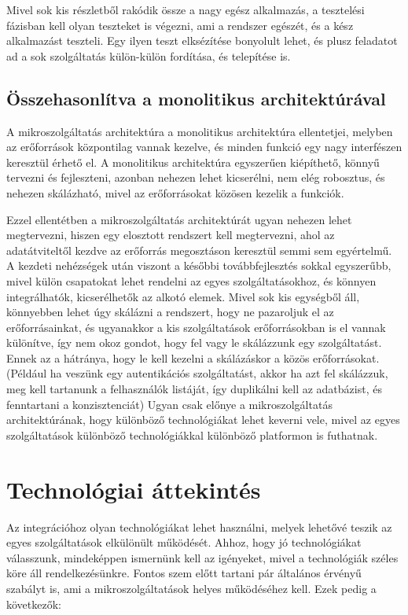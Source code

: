 \documentclass[11pt,magyar,a4paper,twoside,]{report}
\begin{document}
Mivel sok kis részletből rakódik össze a nagy egész alkalmazás, a
tesztelési fázisban kell olyan teszteket is végezni, ami a rendszer
egészét, és a kész alkalmazást teszteli. Egy ilyen teszt elksézítése
bonyolult lehet, és plusz feladatot ad a sok szolgáltatás külön-külön
fordítása, és telepítése is.

\subsection{Összehasonlítva a monolitikus
architektúrával}\label{uxf6sszehasonluxedtva-a-monolitikus-architektuxfaruxe1val}

A mikroszolgáltatás architektúra a monolitikus architektúra ellentetjei,
melyben az erőforrások központilag vannak kezelve, és minden funkció egy
nagy interfészen keresztül érhető el. A monolitikus architektúra
egyszerűen kiépíthető, könnyű tervezni és fejleszteni, azonban nehezen
lehet kicserélni, nem elég robosztus, és nehezen skálázható, mivel az
erőforrásokat közösen kezelik a funkciók.

Ezzel ellentétben a mikroszolgáltatás architektúrát ugyan nehezen lehet
megtervezni, hiszen egy elosztott rendszert kell megtervezni, ahol az
adatátviteltől kezdve az erőforrás megosztáson keresztül semmi sem
egyértelmű. A kezdeti nehézségek után viszont a későbbi továbbfejlesztés
sokkal egyszerűbb, mivel külön csapatokat lehet rendelni az egyes
szolgáltatásokhoz, és könnyen integrálhatók, kicserélhetők az alkotó
elemek. Mivel sok kis egységből áll, könnyebben lehet úgy skálázni a
rendszert, hogy ne pazaroljuk el az erőforrásainkat, és ugyanakkor a kis
szolgáltatások erőforrásokban is el vannak különítve, így nem okoz
gondot, hogy fel vagy le skálázzunk egy szolgáltatást. Ennek az a
hátránya, hogy le kell kezelni a skálázáskor a közös
erőforrásokat.(Például ha veszünk egy autentikációs szolgáltatást, akkor
ha azt fel skálázzuk, meg kell tartanunk a felhasználók listáját, így
duplikálni kell az adatbázist, és fenntartani a konzisztenciát) Ugyan
csak előnye a mikroszolgáltatás architektúrának, hogy különböző
technológiákat lehet keverni vele, mivel az egyes szolgáltatások
különböző technológiákkal különböző platformon is futhatnak.

\section{Technológiai
áttekintés}\label{technoluxf3giai-uxe1ttekintuxe9s}

Az integrációhoz olyan technológiákat\citep{micro-introPt1} lehet
használni, melyek lehetővé teszik az egyes szolgáltatások elkülönült
működését. Ahhoz, hogy jó technológiákat válasszunk, mindeképpen
ismernünk kell az igényeket, mivel a technológiák széles köre áll
rendelkezésünkre. Fontos szem előtt tartani pár általános érvényű
szabályt is\citep{micro-golden}, ami a mikroszolgáltatások helyes
működéséhez kell. Ezek pedig a következők:
\end{document}
